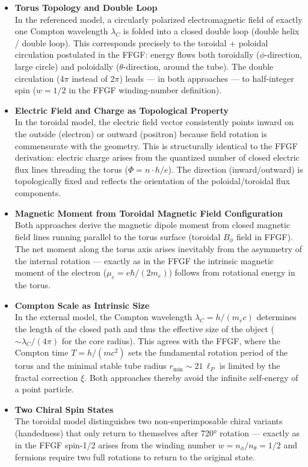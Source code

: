 \documentclass[12pt,a4paper]{article}
\begin{document}
\begin{itemize}
	\item \textbf{Torus Topology and Double Loop}\\
	In the referenced model, a circularly polarized electromagnetic field of exactly one Compton wavelength $\lambda_C$ is folded into a closed double loop (double helix / double loop). This corresponds precisely to the toroidal + poloidal circulation postulated in the FFGF: energy flows both toroidally ($\phi$-direction, large circle) and poloidally ($\theta$-direction, around the tube). The double circulation (4$\pi$ instead of 2$\pi$) leads — in both approaches — to half-integer spin ($w = 1/2$ in the FFGF winding-number definition).
	
	\item \textbf{Electric Field and Charge as Topological Property}\\
	In the toroidal model, the electric field vector consistently points inward on the outside (electron) or outward (positron) because field rotation is commensurate with the geometry. This is structurally identical to the FFGF derivation: electric charge arises from the quantized number of closed electric flux lines threading the torus ($\Phi = n \cdot h/e$). The direction (inward/outward) is topologically fixed and reflects the orientation of the poloidal/toroidal flux components.
	
	\item \textbf{Magnetic Moment from Toroidal Magnetic Field Configuration}\\
	Both approaches derive the magnetic dipole moment from closed magnetic field lines running parallel to the torus surface (toroidal $B_\phi$ field in FFGF). The net moment along the torus axis arises inevitably from the asymmetry of the internal rotation — exactly as in the FFGF the intrinsic magnetic moment of the electron ($\mu_e = e\hbar / (2m_e)$) follows from rotational energy in the torus.
	
	\item \textbf{Compton Scale as Intrinsic Size}\\
	In the external model, the Compton wavelength $\lambda_C = h/(m_ec)$ determines the length of the closed path and thus the effective size of the object ($\sim \lambda_C / (4\pi)$ for the core radius). This agrees with the FFGF, where the Compton time $T = h/(m c^2)$ sets the fundamental rotation period of the torus and the minimal stable tube radius $r_{\min} \sim 21\,\ell_P$ is limited by the fractal correction $\xi$. Both approaches thereby avoid the infinite self-energy of a point particle.
	
	\item \textbf{Two Chiral Spin States}\\
	The toroidal model distinguishes two non-superimposable chiral variants (handedness) that only return to themselves after 720° rotation — exactly as in the FFGF spin-1/2 arises from the winding number $w = n_\phi / n_\theta = 1/2$ and fermions require two full rotations to return to the original state.
\end{itemize}
\end{document}
